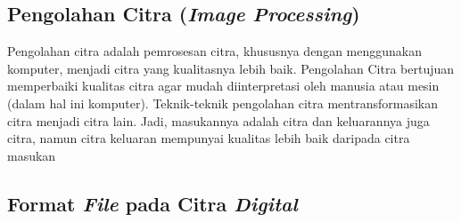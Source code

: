 	\subsection{Pengolahan Citra (\emph{Image Processing})}
	Pengolahan citra adalah pemrosesan citra, khususnya dengan menggunakan komputer, menjadi citra yang kualitasnya lebih baik. Pengolahan Citra bertujuan memperbaiki kualitas citra agar mudah diinterpretasi oleh manusia atau mesin (dalam hal ini komputer). Teknik-teknik pengolahan citra mentransformasikan citra menjadi citra lain. Jadi, masukannya adalah citra dan keluarannya juga citra, namun citra keluaran mempunyai kualitas lebih baik daripada citra masukan \cite{munir04}
	
	\subsection{Format \emph{File} pada Citra \emph{Digital}}
